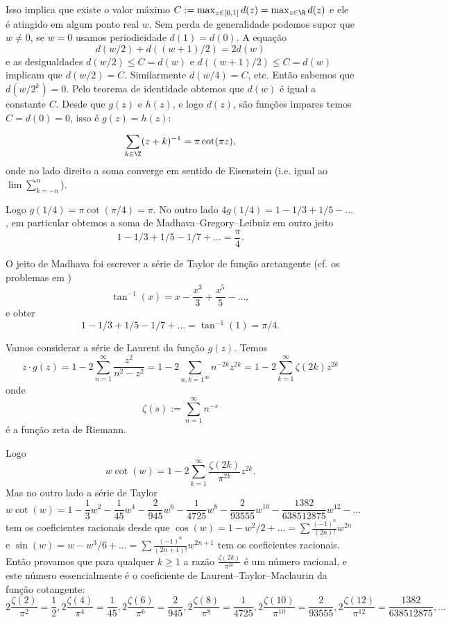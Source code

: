 Isso implica que existe o valor máximo $C := \max_{z\in [0,1]} d(z) = \max_{z\in\R} d(z)$
e ele é atingido em algum ponto real $w$.
Sem perda de generalidade podemos supor que $w\neq 0$, se $w=0$ usamos periodicidade $d(1) = d(0)$.
A equação
\[ d(w/2) + d((w+1)/2) = 2 d(w) \]
e as desigualdades $d(w/2) \leq C = d(w)$ e $d((w+1)/2) \leq C = d(w)$ implicam
que $d(w/2) = C$. Similarmente $d(w/4) = C$, etc. Então sabemos que
$d(w/2^k)=0$. Pelo teorema de identidade obtemos que $d(w)$ é igual a constante $C$.
Desde que $g(z)$ e $h(z)$, e logo $d(z)$, são funções impares temos $C = d(0) = 0$,
isso é $g(z) = h(z)$:

\begin{equation}
\sum_{k\in\Z} (z+k)^{-1} = \pi \cot(\pi z),
\end{equation}
onde no lado direito a soma converge em sentido de Eisenstein
(i.e. igual ao $\lim \sum_{k=-n}^n$).

Logo $g(1/4) = \pi \cot(\pi/4) = \pi$.
No outro lado
$4 g(1/4) = 1 - 1/3 + 1/5 - \dots$,
em particular obtemos a soma de Madhava--Gregory--Leibniz em outro jeito
\[ 1 - 1/3 + 1/5 - 1/7 + \dots = \frac{\pi}{4}. \]

O jeito de Madhava foi escrever a série de Taylor de função arctangente
(cf. os problemas em )
\[ \tan^{-1}(x) = x - \frac{x^3}3 + \frac{x^5}5 - \dots, \]
e obter
\[ 1 - 1/3 + 1/5 - 1/7 + \dots = \tan^{-1}(1) = \pi/4. \]


Vamos considerar a série de Laurent da função $g(z)$. Temos
\begin{equation}
z \cdot g(z) = 1 - 2 \sum_{n=1}^\infty \frac{z^2}{n^2-z^2} = 1 - 2 \sum_{n,k=1^\infty} n^{-2k} z^{2k}
= 1 - 2 \sum_{k=1}^\infty \zeta(2k) z^{2k}
\end{equation}
onde
\begin{equation}
\zeta(s) := \sum_{n=1}^\infty n^{-s}
\end{equation}
é a função zeta de Riemann.

Logo
\begin{equation}
w \cot(w) = 1 - 2 \sum_{k=1}^\infty \frac{\zeta(2k)}{\pi^{2k}} z^{2k}.
\end{equation}
Mas no outro lado a série de Taylor
\[ w \cot(w) = 1 - \frac{1}{3} w^2 - \frac{1}{45} w^4 - \frac{2}{945} w^6 
  -\frac{1}{4725} w^8 - \frac{2}{93555} w^{10} - \frac{1382}{638512875} w^{12} 
 -\dots \]
tem os coeficientes racionais desde
que $\cos(w) = 1 - w^2/2 + \dots = \sum \frac{(-1)^n}{(2n)!} w^{2n}$ e
$\sin(w) = w - w^3/6 + \dots = \sum \frac{(-1)^n}{(2n+1)!} w^{2n+1}$
tem os coeficientes racionais.
Então provamos que para qualquer $k\geq 1$ a razão $\frac{\zeta(2k)}{\pi^{2k}}$
é um número racional, e este número essencialmente é o coeficiente de Laurent--Taylor--Maclaurin
da função cotangente:
\[
2 \frac{\zeta(2)}{\pi^2} = \frac{1}{2},
2 \frac{\zeta(4)}{\pi^4} = \frac{1}{45},
2 \frac{\zeta(6)}{\pi^6} = \frac{2}{945},
2 \frac{\zeta(8)}{\pi^8} = \frac{1}{4725},
2 \frac{\zeta(10)}{\pi^{10}} = \frac{2}{93555},
2 \frac{\zeta(12)}{\pi^{12}} = \frac{1382}{638512875}, 
\dots \]

